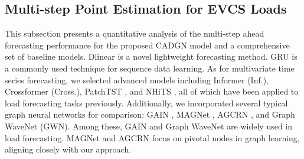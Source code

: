 \documentclass[lettersize,journal]{IEEEtran}
\begin{document}
\vspace{-10pt}
\subsection{Multi-step Point Estimation for EVCS Loads}

This subsection presents a quantitative analysis of the multi-step ahead forecasting performance for the proposed CADGN model and a comprehensive set of baseline models.
Dlinear \cite{zeng2023transformers} is a novel lightweight forecasting method. GRU \cite{conference/emnlp2014/1724Cho} is a commonly used technique for sequence data learning. 
As for multivariate time series forecasting, we selected advanced models including Informer \cite{conference/aaai2021/11106Zhou} (Inf.), Crossformer \cite{conference/iclr2023/zhang} (Cross.), PatchTST \cite{conference/iclr2023/NieNSK23}, and NHiTS \cite{conference/aaai2023/ChalluOORCD23}, all of which have been applied to load forecasting tasks previously.
Additionally, we incorporated several typical graph neural networks for comparison: GAIN \cite{journal/energy2023/278Wang}, MAGNet \cite{journal/tkde2023/10Chen}, AGCRN \cite{conference/nips2020/33bai}, and Graph WaveNet \cite{conference/ijcai2019/1907Wu} (GWN). Among these, GAIN and Graph WaveNet are widely used in load forecasting. MAGNet and AGCRN focus on pivotal nodes in graph learning, aligning closely with our approach.
\end{document}

